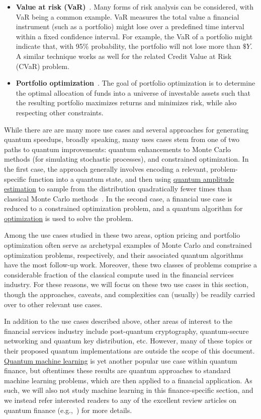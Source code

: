 \begin{refsection}
\begin{itemize}
    \item \textbf{Value at risk (VaR)}~\cite{woerner2019quantum}. Many forms of risk analysis can be considered, with VaR being a common example. VaR measures the total value a financial instrument (such as a portfolio) might lose over a predefined time interval within a fixed confidence interval. For example, the VaR of a portfolio might indicate that, with 95\% probability, the portfolio will not lose more than $\$Y$. A similar technique works as well for the related Credit Value at Risk (CVaR) problem.
    \item \textbf{Portfolio optimization}~\cite{rebentrost2018QuantumFinance}. The goal of portfolio optimization is to determine the optimal allocation of funds into a universe of investable assets such that the resulting portfolio maximizes returns and minimizes risk, while also respecting other constraints.
\end{itemize}
While there are are many more use cases and several approaches for generating quantum speedups, broadly speaking, many uses cases stem from one of two paths to quantum improvements: quantum enhancements to Monte Carlo methods (for simulating stochastic processes), and constrained optimization. 
In the first case, the approach generally involves encoding a relevant, problem-specific function into a quantum state, and then using \hyperref[prim:AA]{quantum amplitude estimation} to sample from the distribution quadratically fewer times than classical Monte Carlo methods~\cite{montanaro2015QMonteCarlo}. In the second case, a financial use case is reduced to a constrained optimization problem, and a quantum algorithm for \hyperref[appl:ContinuousOpt]{optimization} is used to solve the problem. 

Among the use cases studied in these two areas, option pricing and portfolio optimization often serve as archetypal examples of Monte Carlo and constrained optimization problems, respectively, and their associated quantum algorithms have the most follow-up work. Moreover, these two classes of problems comprise a considerable fraction of the classical compute used in the financial services industry. For these reasons, we will focus on these two use cases in this section, though the approaches, caveats, and complexities can (usually) be readily carried over to other relevant use cases.

In addition to the use cases described above, other areas of interest to the financial services industry include post-quantum cryptography, quantum-secure networking and quantum key distribution, etc. However, many of these topics or their proposed quantum implementations are outside the scope of this document. \hyperref[appl:ClassicalML]{Quantum machine learning} is yet another popular use case within quantum finance, but oftentimes these results are quantum approaches to standard machine learning problems, which are then applied to a financial application. As such, we will also not study machine learning in this finance-specific section, and we instead refer interested readers to any of the excellent review articles on quantum finance (e.g.,~\cite{herman2022survey, bouland2020prospects}) for more details.


\end{refsection}
